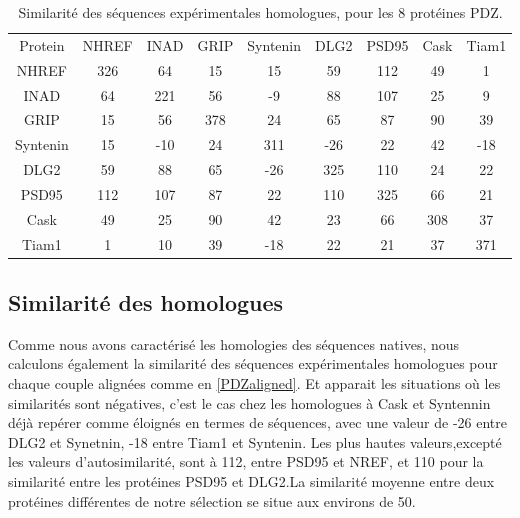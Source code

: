     \begin{table}[!htbp]
      \centering

      \begin{tabular}{ccccccccc}

        \toprule
        Protein & NHREF        & INAD      & GRIP        & Syntenin        & DLG2       & PSD95       & Cask       & Tiam1 \\
        \cmidrule{1-9}

        NHREF    & 326 &  64 &  15 &  15 &  59 & 112 & 49  &   1  \\     
        INAD    &  64 & 221 &  56 &  -9 &  88 & 107 & 25  &   9  \\
        GRIP    &  15 &  56 & 378 &  24 &  65 &  87 & 90  &  39  \\
        Syntenin    &  15 & -10 &  24 & 311 & -26 &  22 & 42  & -18  \\
        DLG2    &  59 &  88 &  65 & -26 & 325 & 110 & 24  &  22  \\
        PSD95    & 112 & 107 &  87 &  22 & 110 & 325 & 66  &  21  \\
        Cask    &  49 &  25 &  90 &  42 &  23 &  66 & 308 & 37   \\
        Tiam1   &  1  &  10 &  39 & -18 &  22 &  21 & 37  & 371 \\
        \bottomrule


      \end{tabular} 
      \caption{Similarité des séquences expérimentales homologues, pour les 8 protéines PDZ.}
\label{tab:XSIMIL}      
    \end{table}

    \subsection{Similarité des homologues}

Comme nous avons caractérisé les homologies des séquences natives, nous calculons également la similarité des séquences expérimentales homologues pour chaque couple alignées comme en \ref{PDZaligned}. Et apparait les situations où les similarités sont négatives, c'est le cas chez les homologues à Cask et Syntennin déjà repérer comme éloignés en termes de séquences, avec une valeur de -26 entre DLG2 et Synetnin, -18 entre Tiam1  et Syntenin. Les plus hautes valeurs,excepté les valeurs d'autosimilarité, sont à  112, entre PSD95 et NREF, et 110 pour la similarité entre les protéines PSD95 et DLG2.La similarité moyenne entre deux protéines différentes de notre sélection se situe aux environs de 50. 


